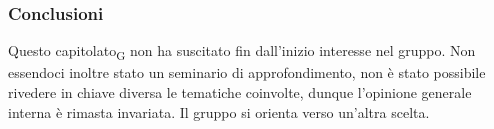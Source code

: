 \subsubsection{Conclusioni}

Questo capitolato\textsubscript{G} non ha suscitato fin dall'inizio interesse nel gruppo. Non essendoci inoltre stato un seminario di approfondimento, non è stato possibile rivedere in chiave diversa le tematiche coinvolte, dunque l'opinione generale interna è rimasta invariata. Il gruppo si orienta verso un'altra scelta.




